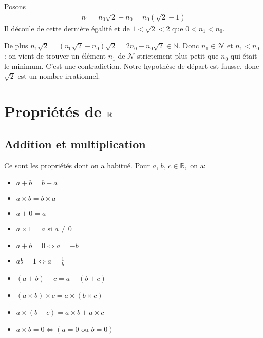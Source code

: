 \documentclass[letterpaper,10pt,french]{jupyterBook}
\begin{document}
\sphinxAtStartPar
Posons
\begin{equation*}
\begin{split}
n_1=n_0 \sqrt{2}-n_0=n_0 (\sqrt{2}-1)
\end{split}
\end{equation*}
\sphinxAtStartPar
Il découle de cette dernière égalité et de \(1 <\sqrt{2} < 2\) que \(0 < n_1 < n_0.\)

\sphinxAtStartPar
De plus \(n_1 \sqrt{2}= (n_0 \sqrt{2}-n_0
)\sqrt{2}= 2n_0-n_0 \sqrt{2}\in \mathbb{N}.\) Donc \(n_1\in \mathcal{N}\) et \(n_1 < n_0\)
: on vient de trouver un élément \(n_1\) de
\(\mathcal{N}\) strictement plus petit que \(n_0\) qui était le minimum. C’est une contradiction.
Notre hypothèse de départ est fausse, donc \(\sqrt{2}\) est un nombre irrationnel.


\section{Propriétés de \protect\(\mathbb{R}\protect\)}
\label{\detokenize{proprties:proprietes-de-mathbb-r}}\label{\detokenize{proprties::doc}}

\subsection{Addition et multiplication}
\label{\detokenize{proprties:addition-et-multiplication}}
\sphinxAtStartPar
Ce sont les propriétés dont on a habitué. Pour \(a,\,b,\,c\in\mathbb{R},\) on a:
\begin{itemize}
\item {} 
\sphinxAtStartPar
\(a+b=b+a\)

\item {} 
\sphinxAtStartPar
\(a\times b=b\times a\)

\item {} 
\sphinxAtStartPar
\(a+0=a\)

\item {} 
\sphinxAtStartPar
\( a\times 1=a \mbox{ si } a\neq0\)

\item {} 
\sphinxAtStartPar
\(a+b=0\Leftrightarrow a=-b\)

\item {} 
\sphinxAtStartPar
\(ab=1\Leftrightarrow a=\frac{1}{b}\)

\item {} 
\sphinxAtStartPar
\((a+b)+c=a+(b+c)\)

\item {} 
\sphinxAtStartPar
\((a\times b)\times c=a\times(b\times c)\)

\item {} 
\sphinxAtStartPar
\(a\times(b+c)=a\times b+a\times c\)

\item {} 
\sphinxAtStartPar
\(a\times b=0\Leftrightarrow(a=0 \mbox{ ou } b=0)\)

\end{itemize}
\end{document}
